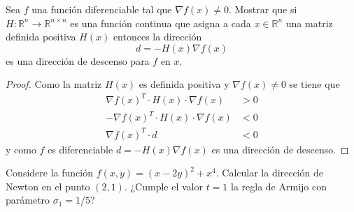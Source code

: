 \documentclass{article}
\newenvironment{theorem}[2][Ejercicio]{\begin{trivlist}
\item[\hskip \labelsep {\bfseries #1}\hskip \labelsep {\bfseries #2.}]}{\end{trivlist}}
\begin{document}
\begin{theorem}{4}
    Sea \(f\) una función diferenciable tal que \(\nabla f(x) \neq 0\).
    Mostrar que si \(H : \mathbb{R}^n \to \mathbb{R}^{n \times n}\) es una función continua que asigna a
    cada \(x \in \mathbb{R}^n\) una matriz definida positiva \(H(x)\) entonces la dirección
    \[
        d = - H(x) \nabla f(x)
    \]
    es una dirección de descenso para \(f\) en \(x\).
\end{theorem}

\begin{proof}
    Como la matriz  \( H(x) \) es definida positiva y \( \nabla f(x) \neq 0 \) se tiene que \begin{align*}
        {\nabla f(x)}^T \cdot H(x) \cdot \nabla f(x)  & > 0 \\
        -{\nabla f(x)}^T \cdot H(x) \cdot \nabla f(x) & < 0 \\
        {\nabla f(x)}^T \cdot d                       & < 0
    \end{align*}
    y como \( f \) es diferenciable \( d = - H(x) \nabla{f(x)} \) es una dirección de descenso.
\end{proof}

\vspace{0.25in}

\begin{theorem}{5}
    Considere la función \( f(x,y) = {(x - 2y)}^2 + x^4 \).
    Calcular la dirección de Newton en el punto \((2,1)\).
    ¿Cumple el valor \(t = 1\) la regla de Armijo con parámetro \(\sigma_1 = 1/5\)?
\end{theorem}
\end{document}
